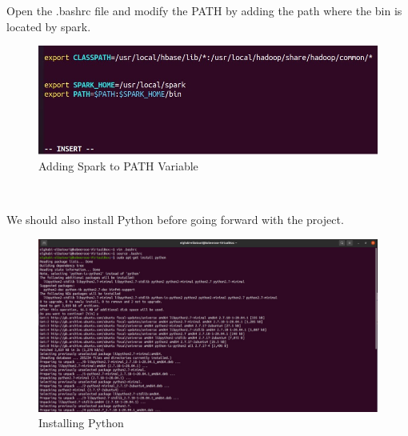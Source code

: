 \begin{spacing}{1.2}
\par Open the .bashrc file and modify the PATH by adding the path where the bin is located
by spark.
\\
\begin{figure}[!htb] 
\begin{center} 
\includegraphics[width=1\linewidth]{Pictures/HBase/Data processing with Spark/Installing and Configuring Spark-2.4.3/Adding Spark to PATH Variable} 
\end{center} 
\caption{Adding Spark to PATH Variable} 
\end{figure}  \FloatBarrier
\\
\newpage
\par We should also install Python before going forward with the project.
\\
\begin{figure}[!htb] 
\begin{center} 
\includegraphics[width=1\linewidth]{Pictures/HBase/Data processing with Spark/Installing and Configuring Spark-2.4.3/Installing Python} 
\end{center} 
\caption{Installing Python} 
\end{figure}  \FloatBarrier
\\


\end{spacing}

